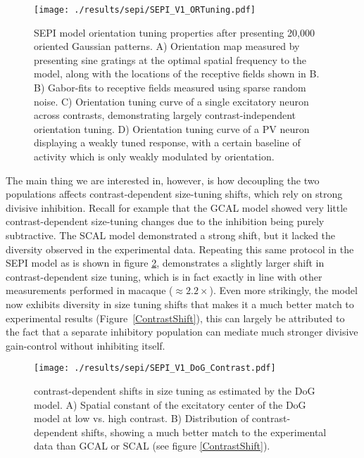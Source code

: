 \begin{figure}
	\centering
    \texttt{[image: ./results/sepi/SEPI\_V1\_ORTuning.pdf]}
	\caption{SEPI model orientation tuning properties after presenting
      20,000 oriented Gaussian patterns. A) Orientation map measured
      by presenting sine gratings at the optimal spatial frequency to
      the model, along with the locations of the receptive fields
      shown in B. B) Gabor-fits to receptive fields measured using
      sparse random noise. C) Orientation tuning curve of a single
      excitatory neuron across contrasts, demonstrating largely
      contrast-independent orientation tuning. D) Orientation tuning
      curve of a PV neuron displaying a weakly tuned response, with a
      certain baseline of activity which is only weakly modulated by
      orientation.}
	\label{SEPIORTuning}
\end{figure}

The main thing we are interested in, however, is how decoupling the
two populations affects contrast-dependent size-tuning shifts, which
rely on strong divisive inhibition. Recall for example that the GCAL
model showed very little contrast-dependent size-tuning changes due to
the inhibition being purely subtractive. The SCAL model demonstrated a
strong shift, but it lacked the diversity observed in the experimental
data. Repeating this same protocol in the SEPI model as is shown in
figure \ref{SEPI_DoG_Contrast}, demonstrates a slightly larger shift
in contrast-dependent size tuning, which is in fact exactly in line
with other measurements performed in macaque ($\approx
2.2\times$). Even more strikingly, the model now exhibits diversity in
size tuning shifts that makes it a much better match to experimental
results (Figure~\ref{ContrastShift}), this can largely be
attributed to the fact that a separate inhibitory population can
mediate much stronger divisive gain-control without inhibiting itself.

\begin{figure}
	\centering
        \texttt{[image: ./results/sepi/SEPI\_V1\_DoG\_Contrast.pdf]}
	\caption{contrast-dependent shifts in size tuning as estimated by
      the DoG model. A) Spatial constant of the excitatory center of
      the DoG model at low vs. high contrast. B) Distribution of
      contrast-dependent shifts, showing a much better match to the
      experimental data than GCAL or SCAL (see figure
      \ref{ContrastShift}).}
	\label{SEPI_DoG_Contrast}
\end{figure}

